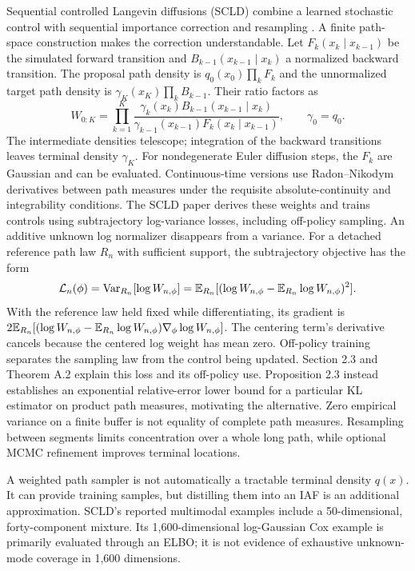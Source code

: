 Sequential controlled Langevin diffusions (SCLD) combine a learned stochastic
control with sequential importance correction and resampling
\citep[Section 2, Algorithms 1--4 and Appendix A]{chen2025scld}.
A finite path-space construction makes the correction understandable. Let
$F_k(x_k\mid x_{k-1})$ be the simulated forward transition and
$B_{k-1}(x_{k-1}\mid x_k)$ a normalized backward transition. The proposal
path density is $q_0(x_0)\prod_kF_k$ and the unnormalized target path density
is $\gamma_K(x_K)\prod_kB_{k-1}$. Their ratio factors as
\begin{equation}
 W_{0:K}=\prod_{k=1}^K
 \frac{\gamma_k(x_k)B_{k-1}(x_{k-1}\mid x_k)}
      {\gamma_{k-1}(x_{k-1})F_k(x_k\mid x_{k-1})},
 \qquad\gamma_0=q_0.
 \label{eq:bf-is-path-weight}
\end{equation}
The intermediate densities telescope; integration of the backward transitions
leaves terminal density $\gamma_K$. For nondegenerate Euler diffusion steps,
the $F_k$ are Gaussian and can be evaluated. Continuous-time versions use
Radon--Nikodym derivatives between path measures under the requisite
absolute-continuity and integrability conditions. The SCLD paper derives these
weights and trains controls using subtrajectory log-variance losses, including
off-policy sampling. An additive unknown log normalizer disappears from a
variance. For a detached reference path law $R_n$ with sufficient support, the
subtrajectory objective has the form
\begin{equation}
 \mathcal L_n(\phi)=\operatorname{Var}_{R_n}[\log W_{n,\phi}]
 =\mathbb{E}_{R_n}[(\log W_{n,\phi}-\mathbb{E}_{R_n}\log W_{n,\phi})^2].
 \label{eq:bf-is-scld-loss}
\end{equation}
With the reference law held fixed while differentiating, its gradient is
$2\mathbb{E}_{R_n}[(\log W_{n,\phi}-\mathbb{E}_{R_n}\log W_{n,\phi})
\nabla_\phi\log W_{n,\phi}]$. The centering term's derivative cancels because
the centered log weight has mean zero. Off-policy training separates the
sampling law from the control being updated. Section 2.3 and Theorem A.2
explain this loss and its off-policy use. Proposition 2.3 instead establishes
an exponential relative-error lower bound for a particular KL estimator on
product path measures, motivating the alternative. Zero empirical variance on
a finite buffer is not equality of complete path measures. Resampling between
segments limits concentration over a whole long path, while optional MCMC
refinement improves terminal locations.

A weighted path sampler is not automatically a tractable terminal density
$q(x)$. It can provide training samples, but distilling them into an IAF is an
additional approximation. SCLD's reported multimodal examples include a
50-dimensional, forty-component mixture. Its 1,600-dimensional log-Gaussian
Cox example is primarily evaluated through an ELBO; it is not evidence of
exhaustive unknown-mode coverage in 1,600 dimensions.


